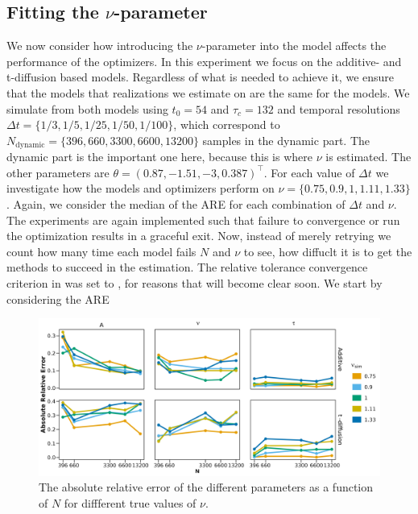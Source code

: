 \subsection{Fitting the $\nu$-parameter}
We now consider how introducing the $\nu$-parameter into the model affects the performance of the optimizers. In this experiment we focus on the additive- and t-diffusion based models. Regardless of what is needed to achieve it, we ensure that the models that realizations we estimate on are the same for the models. We simulate from both models using $t_0 = 54$ and $\tau_c = 132$ and temporal resolutions $\Delta t = \{1/3, 1/5, 1/25, 1/50, 1/100\}$, which correspond to $N_\mathrm{dynamic} = \{396, 660, 3300, 6600, 13200\}$ samples in the dynamic part. The dynamic part is the important one here, because this is where $\nu$ is estimated. The other parameters are $\theta = (0.87, -1.51, -3,  0.387)^\top$. For each value of $\Delta t$ we investigate how the models and optimizers perform on $\nu = \{0.75, 0.9, 1, 1.11, 1.33\}$. Again, we consider the median of the ARE for each combination of $\Delta t$ and $\nu$. The experiments are again implemented such that failure to convergence or run the optimization results in a graceful exit. Now, instead of merely retrying we count how many time each model fails $N$ and $\nu$ to see, how diffuclt it is to get the methods to succeed in the estimation. The relative tolerance convergence criterion in  was set to , for reasons that will become clear soon. We start by considering the ARE 
\begin{figure}[h!]
    \begin{center}
        \includegraphics[scale = .1]{figures/combined_nus_plot.jpeg}
        \caption{The absolute relative error of the different parameters as a function of $N$ for diffferent true values of $\nu$.}
        \label{figure:ARE_nu_plots}
    \end{center}
\end{figure}

